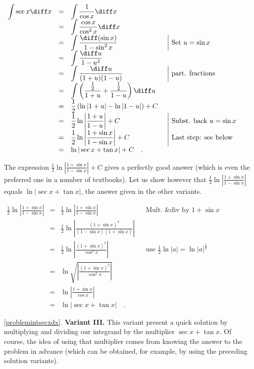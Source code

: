 {$\begin{array}{rcll|l}
\displaystyle \int \sec x \diff x&=&\displaystyle \int \frac{1}{\cos x}\diff x\\
&=&\displaystyle \int \frac{\cos x}{\cos^2x}\diff x\\
&=&\displaystyle \int \frac{\diff (\sin x)}{1-\sin^2x}&&\text{Set }u=\sin x\\
&=&\displaystyle \int \frac{\diff u}{1-u^2}\\
&=&\displaystyle \int \frac{\diff u}{(1+u)(1-u)}&&\text{part. fractions}\\
&=&\displaystyle \int \left(\frac{\frac{1}{2}}{1+u} +\frac{ \frac{1}{ 2}}{1 -u} \right)\diff u \\
&=&\displaystyle \frac{1}{2}\left(\ln |1+u|-\ln|1-u| \right)+C\\
&=&\displaystyle \frac{1}{2}\ln \left|\frac{1+u}{1-u} \right|+C &&\text{Subst. back } u=\sin x \\
&=&\displaystyle \frac{1}{2} \ln \left|\frac{1+\sin x}{1-\sin x}\right|+C&&\text{Last step: see below}\\
&=&\displaystyle \ln|\sec x+\tan x|+C\quad .
\end{array}
$

The expression $\frac{1}{2} \ln \left|\frac{1+\sin x}{1-\sin x}\right|+C$ gives a perfectly good answer (which is even the preferred one in a number of textbooks). Let us show however that $\frac{1}{2} \ln \left|\frac{1+\sin x}{1-\sin x}\right|$ equals $\ln |\sec x+\tan x|$, the answer given in the other variants.

$\begin{array}{rcll|l}
\displaystyle \frac{1}{2}  \ln \left|\frac{1+\sin x}{1-\sin x}\right|&=& \frac{1}{2} \ln \left|\frac{1+\sin x}{1-\sin x}\right| &&\text{Mult. \& div by } 1+\sin x\\
&=&\frac{1}{2}\ln \left|\frac{(1+\sin x)^2}{(1-\sin x)(1+\sin x)}\right|\\
&=&\frac{1}{2}\ln \left|\frac{(1+\sin x)^2}{\cos^2x}\right|&& \text{use }\frac{1}{2}\ln |a|= \ln |a|^{\frac{1}{2}}\\
&=&\ln \sqrt{\left|\frac{(1+\sin x)^2}{\cos^2x}\right|}\\
&=&\ln \left|\frac{1+\sin x}{\cos x}\right|\\
&=&\ln |\sec x +\tan x|\quad .
\end{array}
$

\ref{problemintsecxdx}. \textbf{Variant III. } This variant present a quick solution by multiplying and dividing our integrand by the multiplier $\sec x+\tan x$. Of course, the idea of using that multiplier comes from knowing the answer to the problem in advance (which can be obtained, for example, by using the preceding solution variants).

}

